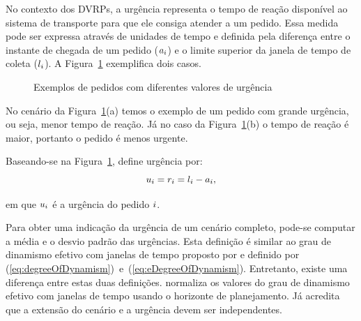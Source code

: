No contexto dos DVRPs, a urgência representa o tempo de reação disponível ao 
sistema de transporte para que ele consiga atender a um pedido.
Essa medida pode ser expressa através de unidades de tempo e definida pela 
diferença entre o instante de chegada de um pedido ($a_i$) 
e o limite superior da janela de tempo de coleta 
($l_i$).
A Figura~\ref{fig:van_lon_measures_2016_urgency} exemplifica dois casos.

\begin{figure}[H]
    \begin{center}
        \caption{Exemplos de pedidos com diferentes valores de urgência 
                 \cite{van_lon_measures_2016}}
        \label{fig:van_lon_measures_2016_urgency}
    \end{center} 
\end{figure}

No cenário da Figura~\ref{fig:van_lon_measures_2016_urgency}(a) temos o exemplo
de um pedido com grande urgência, ou seja, menor tempo de reação.
Já no caso da Figura~\ref{fig:van_lon_measures_2016_urgency}(b) o tempo de 
reação é maior, portanto o pedido é menos urgente.

Baseando-se na Figura~\ref{fig:van_lon_measures_2016_urgency}, 
 define urgência por:
%
\begin{equation}
    u_i = 
    r_i =
    l_i - a_i,
    \label{eq:van_lon_measures_2016_urgency}
\end{equation}

\noindent em que $u_i$ é a urgência do pedido $i$.

Para obter uma indicação da urgência de um cenário completo, pode-se computar a
média e o desvio padrão das urgências. 
Esta definição é similar ao grau de dinamismo efetivo com janelas de tempo 
proposto por  e definido por
(\ref{eq:degreeOfDynamism})~e~(\ref{eq:eDegreeOfDynamism}).
Entretanto, existe uma diferença entre estas duas definições.
 normaliza os valores do grau de dinamismo
efetivo com janelas de tempo usando o horizonte de planejamento.  
Já  acredita que a extensão do cenário e
a urgência devem ser independentes.


